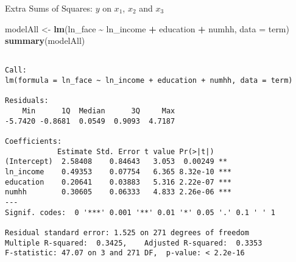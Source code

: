 \documentclass[
  ignorenonframetext,
]{beamer}
\newenvironment{Shaded}{\begin{snugshade}}{\end{snugshade}}
\newcommand{\AttributeTok}[1]{\textcolor[rgb]{0.13,0.29,0.53}{#1}}
\newcommand{\FunctionTok}[1]{\textcolor[rgb]{0.13,0.29,0.53}{\textbf{#1}}}
\newcommand{\NormalTok}[1]{#1}
\newcommand{\OtherTok}[1]{\textcolor[rgb]{0.56,0.35,0.01}{#1}}
\newcommand{\SpecialCharTok}[1]{\textcolor[rgb]{0.81,0.36,0.00}{\textbf{#1}}}
\begin{document}
\begin{frame}[fragile]{Extra Sums of Squares: \(y\) on \(x_1\), \(x_2\)
and \(x_3\)}
\protect\hypertarget{extra-sums-of-squares-y-on-x_1-x_2-and-x_3}{}
\scriptsize

\begin{Shaded}
\begin{Highlighting}[]
\NormalTok{modelAll }\OtherTok{\textless{}{-}} \FunctionTok{lm}\NormalTok{(ln\_face }\SpecialCharTok{\textasciitilde{}}\NormalTok{ ln\_income }\SpecialCharTok{+}\NormalTok{ education }\SpecialCharTok{+}\NormalTok{ numhh, }\AttributeTok{data =}\NormalTok{ term)}
\FunctionTok{summary}\NormalTok{(modelAll)}
\end{Highlighting}
\end{Shaded}

\begin{verbatim}

Call:
lm(formula = ln_face ~ ln_income + education + numhh, data = term)

Residuals:
    Min      1Q  Median      3Q     Max 
-5.7420 -0.8681  0.0549  0.9093  4.7187 

Coefficients:
            Estimate Std. Error t value Pr(>|t|)    
(Intercept)  2.58408    0.84643   3.053  0.00249 ** 
ln_income    0.49353    0.07754   6.365 8.32e-10 ***
education    0.20641    0.03883   5.316 2.22e-07 ***
numhh        0.30605    0.06333   4.833 2.26e-06 ***
---
Signif. codes:  0 '***' 0.001 '**' 0.01 '*' 0.05 '.' 0.1 ' ' 1

Residual standard error: 1.525 on 271 degrees of freedom
Multiple R-squared:  0.3425,    Adjusted R-squared:  0.3353 
F-statistic: 47.07 on 3 and 271 DF,  p-value: < 2.2e-16
\end{verbatim}

\normalsize
\end{frame}
\end{document}
